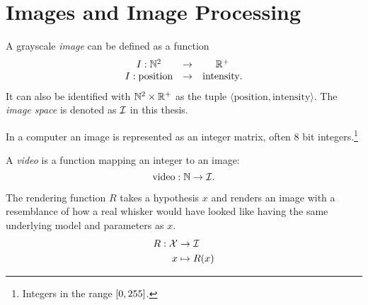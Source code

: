 

\section{Images and Image Processing}
\begin{definition}

  A grayscale \emph{image} can be defined as a function
  \begin{equation}
    \begin{array}{ccc}
      I : \mathbb{N}^2 &\rightarrow& \mathbb{R}^+\\
      I : \text{position}&\rightarrow&\text{intensity}.
    \end{array}
  \end{equation}
  It can also be identified with $\mathbb{N}^2\times \mathbb{R}^+$ as the tuple
  $\langle \text{position}, \text{intensity}\rangle$. The \emph{image
    space} is denoted as $\mathcal{I}$ in this thesis.

  In a computer an image is represented as an integer matrix, often 8
  bit integers.\footnote{Integers in the range $\left[0, 255\right]$.}
\end{definition}

\begin{definition}
  A \emph{video} is a function mapping an integer to an image:
  \begin{equation}
    \text{video} : \mathbb{N} \rightarrow \mathcal{I}.
  \end{equation}
\end{definition}

\begin{definition}
 \label{def:hypothesis_render}
  The rendering function $R$ takes a hypothesis $x$ and renders an
  image with a resemblance of how a real whisker would have looked
  like having the same underlying model and parameters as $x$.
  \begin{equation}
    \begin{split}
      R : \mathcal{X} &\rightarrow \mathcal{I}\\
      x &\mapsto R(x)
    \end{split}
  \end{equation}
\end{definition}

